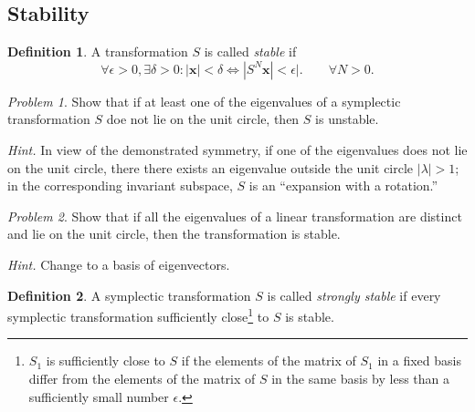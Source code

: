 \documentclass[leqno]{report}
\numberwithin{equation}{section}
\theoremstyle{plain}
\theoremstyle{definition}
\newtheorem*{defn*}{Definition}
\theoremstyle{remark}
\theoremstyle{smallcap}
\newtheorem*{prob*}{Problem}
\numberwithin{prob}{section}
\newcommand{\hint}[1]{\textit{Hint.} #1}
\begin{document}
\setcounter{subsection}{2}
\subsection{Stability}

\begin{defn*}
  A transformation $S$ is called \emph{stable} if
  $$
  \forall \epsilon > 0,
  \exists \delta > 0:
  |\mathbf x| < \delta
  \iff
  |S^N \mathbf x| < \epsilon|.
  \qquad
  \forall N > 0.
  $$
\end{defn*}

\begin{prob*}
  Show that if at least one of the eigenvalues of
  a symplectic transformation $S$ doe not lie on the unit circle,
  then $S$ is unstable.

  \hint{
    In view of the demonstrated symmetry, if one of the eigenvalues
    does not lie on the unit circle, there there exists an eigenvalue
    outside the unit circle $|\lambda| > 1$;
    in the corresponding invariant subspace,
    $S$ is an ``expansion with a rotation.''
  }
\end{prob*}

\begin{prob*}
  Show that if all the eigenvalues of a linear transformation
  are distinct and lie on the unit circle, then the transformation is stable.

  \hint{
    Change to a basis of eigenvectors.
  }

\end{prob*}

\begin{defn*}
  A symplectic transformation $S$ is called \emph{strongly stable}
  if every symplectic transformation sufficiently close\footnote{
    $S_1$ is sufficiently close to $S$ if the elements of
    the matrix of $S_1$ in a fixed basis differ from the
    elements of the matrix of $S$ in the same basis by less than a
    sufficiently small number $\epsilon$.
  }
  to $S$ is stable.
\end{defn*}
\end{document}
